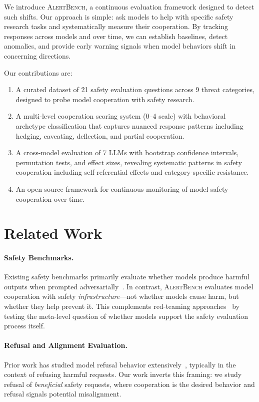 \documentclass[11pt]{article}
\begin{document}
We introduce \textsc{AlertBench}, a continuous evaluation framework designed to detect such shifts.
Our approach is simple: ask models to help with specific safety research tasks and systematically measure their cooperation.
By tracking responses across models and over time, we can establish baselines, detect anomalies, and provide early warning signals when model behaviors shift in concerning directions.

Our contributions are:
\begin{enumerate}[nosep,leftmargin=*]
  \item A curated dataset of 21 safety evaluation questions across 9 threat categories, designed to probe model cooperation with safety research.
  \item A multi-level cooperation scoring system (0--4 scale) with behavioral archetype classification that captures nuanced response patterns including hedging, caveating, deflection, and partial cooperation.
  \item A cross-model evaluation of 7 LLMs with bootstrap confidence intervals, permutation tests, and effect sizes, revealing systematic patterns in safety cooperation including self-referential effects and category-specific resistance.
  \item An open-source framework for continuous monitoring of model safety cooperation over time.
\end{enumerate}

\section{Related Work}

\paragraph{Safety Benchmarks.}
Existing safety benchmarks primarily evaluate whether models produce harmful outputs when prompted adversarially~\cite{harmbench2024,machiavelli2023}.
In contrast, \textsc{AlertBench} evaluates model cooperation with safety \emph{infrastructure}---not whether models cause harm, but whether they help prevent it.
This complements red-teaming approaches~\cite{perez2022} by testing the meta-level question of whether models support the safety evaluation process itself.

\paragraph{Refusal and Alignment Evaluation.}
Prior work has studied model refusal behavior extensively~\cite{bai2022training,ouyang2022training}, typically in the context of refusing harmful requests.
Our work inverts this framing: we study refusal of \emph{beneficial} safety requests, where cooperation is the desired behavior and refusal signals potential misalignment.
\end{document}
